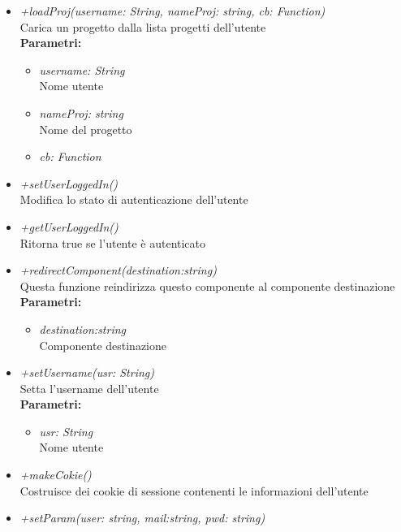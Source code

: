 \begin{itemize}
\begin{itemize}
\begin{itemize}
    		\end{itemize}
    		\item \emph{+loadProj(username: String, nameProj: string, cb: Function)}\\
    		Carica un progetto dalla lista progetti dell'utente\\
    		\textbf{Parametri:}
    		\begin{itemize}
    			\item \emph{username: String}\\
    			Nome utente
    			\item \emph{nameProj: string}\\
    			Nome del progetto
    			\item \emph{cb: Function}\\
    			
    		\end{itemize}
    		\item \emph{+setUserLoggedIn()}\\
    		Modifica lo stato di autenticazione dell'utente
    		\item \emph{+getUserLoggedIn()}\\
    		Ritorna true se l'utente è autenticato
    		\item \emph{+redirectComponent(destination:string)}\\
    		Questa funzione reindirizza questo componente al componente destinazione\\
    		\textbf{Parametri:}
    		\begin{itemize}
    			\item \emph{destination:string}\\
    			Componente destinazione
    		\end{itemize}
    		\item \emph{+setUsername(usr: String)}\\
    		Setta l'username dell'utente\\
    		\textbf{Parametri:}
    		\begin{itemize}
    			\item \emph{usr: String}\\
    			Nome utente
    		\end{itemize}
    		\item \emph{+makeCokie()}\\
    		Costruisce dei cookie di sessione contenenti le informazioni dell'utente
    		\item \emph{+setParam(user: string, mail:string, pwd: string)}\\

\end{itemize}
\end{itemize}
